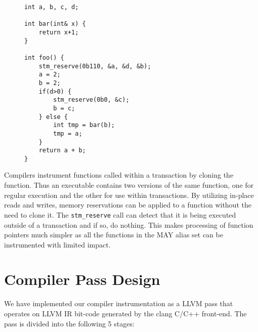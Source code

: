 \documentclass[preprint]{sigplanconf}
\begin{document}
\begin{figure}[h]
\begin{lstlisting}[caption={Reducing redundant memory reservations},label=listing4,captionpos=b]
int a, b, c, d;

int bar(int& x) {
    return x+1;
}

int foo() {
    stm_reserve(0b110, &a, &d, &b);
    a = 2;
    b = 2;
    if(d>0) {
        stm_reserve(0b0, &c);
        b = c;
    } else {
        int tmp = bar(b);
        tmp = a;
    }
    return a + b;
}
\end{lstlisting}
\end{figure}

Compilers instrument functions called within a transaction by cloning the function. Thus an executable contains two versions of the same function, one for regular execution and the other for use within transactions. By utilizing in-place reads and writes, memory reservations can be applied to a function without the need to clone it. The \verb+stm_reserve+ call can detect that it is being executed outside of a transaction and if so, do nothing. This makes processing of function pointers much simpler as all the functions in the MAY alias set can be instrumented with limited impact.

\section{Compiler Pass Design}

We have implemented our compiler instrumentation as a LLVM\cite{1281665} pass that operates on LLVM IR bit-code generated by the clang C/C++ front-end. The pass is divided into the following 5 stages:
\end{document}
